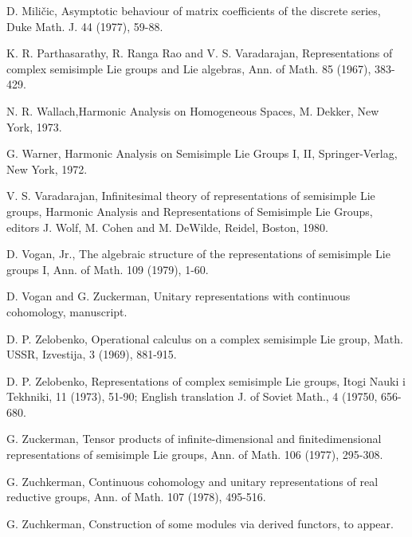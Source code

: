 \begin{thebibliography}{99}
 D. Mili\v cic, Asymptotic behaviour of matrix
  coefficients of the discrete series, Duke Math. J. 44 (1977),
  59-88. 

 K. R. Parthasarathy, R. Ranga Rao and
  V. S. Varadarajan, Representations of complex semisimple Lie groups
  and Lie algebras, Ann. of Math. 85 (1967), 383-429. 

 N. R. Wallach,\pageoriginale  Harmonic Analysis on
  Homogeneous Spaces, M. Dekker, New York, 1973. 

 G. Warner, Harmonic Analysis on Semisimple Lie Groups
  I, II, Springer-Verlag, New York, 1972. 

 V. S. Varadarajan, Infinitesimal theory of
  representations of semisimple Lie groups, Harmonic Analysis and
  Representations of Semisimple Lie Groups, editors J. Wolf, M. Cohen
  and M. DeWilde, Reidel, Boston, 1980. 

 D. Vogan, Jr., The algebraic structure of the
  representations of semisimple Lie groups I, Ann. of Math. 109
  (1979), 1-60. 

 D. Vogan and G. Zuckerman, Unitary representations
  with continuous cohomology, manuscript. 

 D. P. Zelobenko, Operational calculus on a complex
  semisimple Lie group, Math. USSR, Izvestija, 3 (1969), 881-915. 

 D. P. Zelobenko, Representations of complex semisimple
  Lie groups, Itogi Nauki i Tekhniki, 11 (1973), 51-90; English
  translation J. of Soviet Math., 4 (19750, 656-680. 

 G. Zuckerman, Tensor products of infinite-dimensional
  and finitedimensional representations of semisimple Lie groups,
  Ann. of Math. 106 (1977), 295-308. 

 G. Zuchkerman, Continuous cohomology and unitary
  representations of real reductive groups, Ann. of Math. 107 (1978),
  495-516. 

 G. Zuchkerman, Construction of some modules via
  derived functors, to appear. 

\end{thebibliography}
